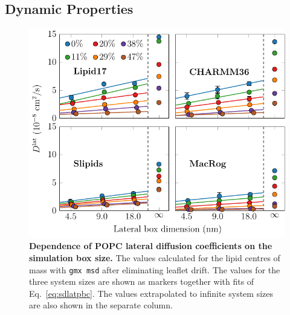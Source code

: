 \documentclass[journal=jpcbfk,manuscript=suppinfo]{achemso}
\begin{document}
\clearpage
\subsection{Dynamic Properties}

\begin{figure}[htb!]
    \centering
    \includegraphics[width=0.9\linewidth]{../FIGS/d_vs_size.pdf}
    \caption{\label{SIfig:dvssize}%
    \textbf{Dependence of POPC lateral diffusion coefficients on the simulation box size.} The values calculated for the lipid centres of mass with \texttt{gmx msd} after eliminating leaflet drift. The values for the three system sizes are shown as markers together with fits of Eq.~\eqref{eq:sdlatpbc}. The values extrapolated to infinite system sizes are also shown in the separate column. 
    }
\end{figure}
\end{document}
